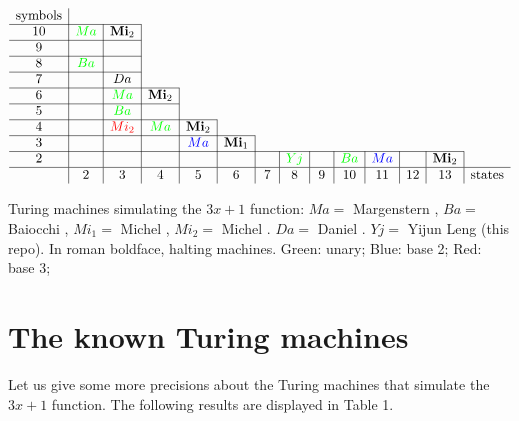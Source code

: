 \documentclass[10pt]{article}
\begin{document}
\begin{table}
$$\begin{array}{c|c|c|c|c|c|c|c|c|c|c|c|c|c}
\mbox{symbols} & \multicolumn{13}{c}{}\\                                                \cline{1-3}
10             & \textcolor{green}{Ma}    & \mbox{\bf Mi}_2& \multicolumn{11}{c}{}\\                       \cline{1-3}
9              &       &      &\multicolumn{11}{c}{}\\                                  \cline{1-3}
8              & \textcolor{green}{Ba}    &      &\multicolumn{11}{c}{}\\                                  \cline{1-3}
7              &       & Da   			 &\multicolumn{11}{c}{}\\                                  \cline{1-4}
6              &       & \textcolor{green}{Ma}   &  \mbox{\bf Mi}_2 & \multicolumn{10}{c}{}\\          \cline{1-4}
5              &       & \textcolor{green}{Ba}   &                  & \multicolumn{10}{c}{}\\          \cline{1-5}
4              &       & \textcolor{red}{Mi_2} & \textcolor{green}{Ma}               &\mbox{\bf Mi}_2 & \multicolumn{9}{c}{}\\         \cline{1-6}
3              &       &      &                  & \textcolor{blue}{Ma}   &\mbox{\bf Mi}_1 & \multicolumn{8}{c}{}\\  \cline{1-13}
2              &       &      &    &      &      &     & \textcolor{green}{Yj}   &   & \textcolor{green}{Ba}  & \textcolor{blue}{Ma} & & \mbox{\bf Mi}_2\\  \hline
               & 2     & 3    & 4  & 5    &\,6\, &\,7\,&\,8\,&\,9\,& 10  & 11 & 12 & 13 & \mbox{states}
\end{array}$$
\caption{Turing machines simulating the $3x + 1$ function:
$Ma=$ Margenstern \cite{Ma98,Ma00},
$Ba=$ Baiocchi \cite{Ba98},
$Mi_1=$ Michel \cite{Mi93},
$Mi_2=$ Michel \cite{Mi14}.
$Da=$ Daniel \cite{Da24}.
$Yj=$ Yijun Leng (this repo).
In roman boldface, halting machines.
Green: unary;
Blue: base 2;
Red: base 3;
}
\end{table}

\section{The known Turing machines}
Let us give some more precisions about the Turing machines that simulate
the $3x + 1$ function. The following results are displayed in Table 1.
\end{document}
